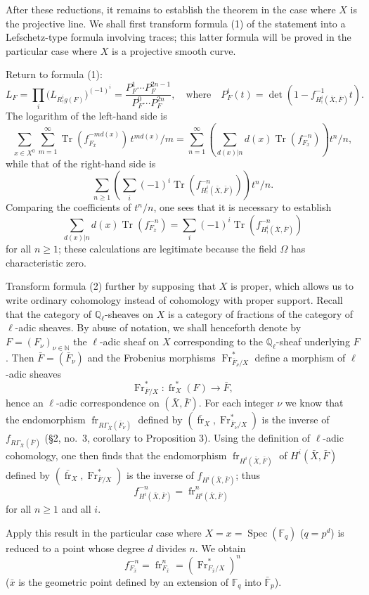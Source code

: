 \documentclass[11pt]{article}
\DeclareMathOperator{\Spec}{Spec}
\providecommand{\Tr}{\operatorname{Tr}}
\providecommand{\Tr}{\operatorname{Tr}}
\providecommand{\Tr}{\operatorname{Tr}}
\providecommand{\Tr}{\operatorname{Tr}}
\providecommand{\Spec}{\operatorname{Spec}}
\providecommand{\Spec}{\operatorname{Spec}}
\providecommand{\Spec}{\operatorname{Spec}}
\providecommand{\Tr}{\operatorname{Tr}}
\providecommand{\fr}{\operatorname{fr}}
\providecommand{\Fr}{\operatorname{Fr}}
\providecommand{\Fr}{\operatorname{Fr}}
\providecommand{\fr}{\operatorname{fr}}
\providecommand{\Spec}{\operatorname{Spec}}
\begin{document}
After these reductions, it remains to establish the theorem in the case where $X$ is the projective line. We shall first transform formula (1) of the statement into a Lefschetz-type formula involving traces; this latter formula will be proved in the particular case where $X$ is a projective smooth curve.

Return to formula (1):
\[
L_F=\prod_i\bigl(L_{R^i_!g(F)}\bigr)^{(-1)^i}
=\frac{P_F^1\cdots P_F^{2n-1}}{P_F^0\cdots P_F^{2n}},
\quad\text{where}\quad
P_F^i(t)=\det(1-f^{-1}_{H^i_!(\bar X,\bar F)}t).
\]
The logarithm of the left-hand side is
\[
\sum_{x\in X^0}\sum_{m=1}^{\infty}\Tr(f_{F_{\bar x}}^{-m d(x)})\,t^{m d(x)}/m
=\sum_{n=1}^{\infty}\left(\sum_{d(x)|n} d(x)\Tr(f_{F_{\bar x}}^{-n})\right)t^n/n,
\]
while that of the right-hand side is
\[
\sum_{n\ge1}\left(\sum_i(-1)^i\Tr(f^{-n}_{H^i_!(\bar X,\bar F)})\right)t^n/n.
\]
Comparing the coefficients of $t^n/n$, one sees that it is necessary to establish
\[
\sum_{d(x)|n}d(x)\Tr(f_{F_{\bar x}}^{-n})
=\sum_i(-1)^i\Tr(f^{-n}_{H^i_!(\bar X,\bar F)})
\tag{2}
\]
for all $n\ge1$; these calculations are legitimate because the field $\Omega$ has characteristic zero.

Transform formula (2) further by supposing that $X$ is proper, which allows us to write ordinary cohomology instead of cohomology with proper support. Recall that the category of $\mathbb Q_\ell$-sheaves on $X$ is a category of fractions of the category of $\ell$-adic sheaves. By abuse of notation, we shall henceforth denote by $F=(F_\nu)_{\nu\in\mathbb N}$ the $\ell$-adic sheaf on $X$ corresponding to the $\mathbb Q_\ell$-sheaf underlying $F$. Then $\bar F=(\bar F_\nu)$ and the Frobenius morphisms $\Fr^*_{\bar F_\nu/X}$ define a morphism of $\ell$-adic sheaves
\[
\Fr^*_{\bar F/X}:\fr_X^*(F)\longrightarrow\bar F,
\]
hence an $\ell$-adic correspondence on $(\bar X,\bar F)$. For each integer $\nu$ we know that the endomorphism $\fr_{R\Gamma_{\bar X}(\bar F_\nu)}$ defined by $(\bar{\fr}_X,\Fr^*_{\bar F_\nu/X})$ is the inverse of $f_{R\Gamma_{\bar X}(\bar F)}$ (§2, no.~3, corollary to Proposition 3). Using the definition of $\ell$-adic cohomology, one then finds that the endomorphism $\fr_{H^i(\bar X,\bar F)}$ of $H^i(\bar X,\bar F)$ defined by $(\bar{\fr}_X,\Fr^*_{\bar F/X})$ is the inverse of $f_{H^i(\bar X,\bar F)}$; thus
\[
f^{-n}_{H^i(\bar X,\bar F)}=\fr^n_{H^i(\bar X,\bar F)}
\]
for all $n\ge1$ and all $i$.

Apply this result in the particular case where $X=x=\Spec(\mathbb F_q)$ ($q=p^d$) is reduced to a point whose degree $d$ divides $n$. We obtain
\[
f^{-n}_{F_{\bar x}}=\fr^n_{F_{\bar x}}=(\Fr^*_{F_{\bar x}/X})^n
\]
($\bar x$ is the geometric point defined by an extension of $\mathbb F_q$ into $\bar{\mathbb F}_p$).
\end{document}
